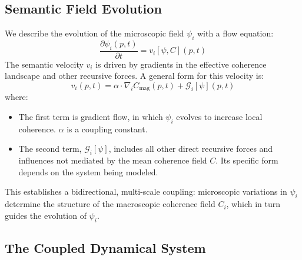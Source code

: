 
\subsection{Semantic Field Evolution}
\label{sec:semantic_field_evolution}

We describe the evolution of the microscopic field \(\psi_i\) with a flow equation:
\begin{equation}
\frac{\partial \psi_i(p, t)}{\partial t} = v_i[\psi, C](p, t)
\end{equation}
The semantic velocity \(v_i\) is driven by gradients in the effective coherence landscape and other recursive forces. A general form for this velocity is:
\begin{equation}
v_i(p, t) = \alpha \cdot \nabla_i C_{\mathrm{mag}}(p, t) + \mathcal{G}_i[\psi](p, t)
\end{equation}
where:
\begin{itemize}
    \item The first term is gradient flow, in which \(\psi_i\) evolves to increase local coherence. \(\alpha\) is a coupling constant.
    \item The second term, \(\mathcal{G}_i[\psi]\), includes all other direct recursive forces and influences not mediated by the mean coherence field \(C\). Its specific form depends on the system being modeled.
\end{itemize}
This establishes a bidirectional, multi-scale coupling: microscopic variations in \(\psi_i\) determine the structure of the macroscopic coherence field \(C_i\), which in turn guides the evolution of \(\psi_i\).


\subsection{The Coupled Dynamical System}
\label{sec:the_coupled_dynamical_system}

